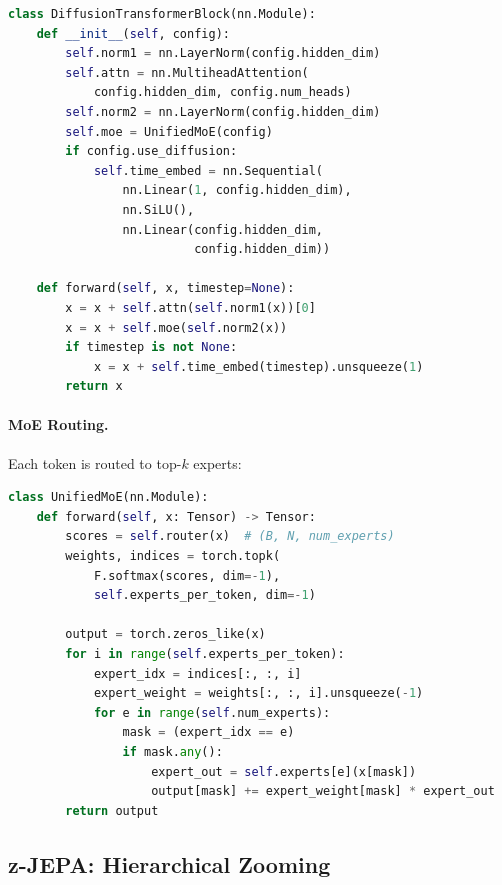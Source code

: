 \documentclass[11pt,twocolumn]{article}
\begin{document}
\begin{lstlisting}[language=Python]
class DiffusionTransformerBlock(nn.Module):
    def __init__(self, config):
        self.norm1 = nn.LayerNorm(config.hidden_dim)
        self.attn = nn.MultiheadAttention(
            config.hidden_dim, config.num_heads)
        self.norm2 = nn.LayerNorm(config.hidden_dim)
        self.moe = UnifiedMoE(config)
        if config.use_diffusion:
            self.time_embed = nn.Sequential(
                nn.Linear(1, config.hidden_dim),
                nn.SiLU(),
                nn.Linear(config.hidden_dim,
                          config.hidden_dim))

    def forward(self, x, timestep=None):
        x = x + self.attn(self.norm1(x))[0]
        x = x + self.moe(self.norm2(x))
        if timestep is not None:
            x = x + self.time_embed(timestep).unsqueeze(1)
        return x
\end{lstlisting}

\paragraph{MoE Routing.} Each token is routed to top-$k$ experts:

\begin{lstlisting}[language=Python]
class UnifiedMoE(nn.Module):
    def forward(self, x: Tensor) -> Tensor:
        scores = self.router(x)  # (B, N, num_experts)
        weights, indices = torch.topk(
            F.softmax(scores, dim=-1),
            self.experts_per_token, dim=-1)

        output = torch.zeros_like(x)
        for i in range(self.experts_per_token):
            expert_idx = indices[:, :, i]
            expert_weight = weights[:, :, i].unsqueeze(-1)
            for e in range(self.num_experts):
                mask = (expert_idx == e)
                if mask.any():
                    expert_out = self.experts[e](x[mask])
                    output[mask] += expert_weight[mask] * expert_out
        return output
\end{lstlisting}

\subsection{z-JEPA: Hierarchical Zooming}
\end{document}
